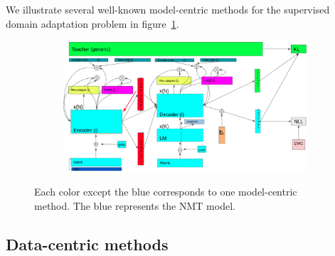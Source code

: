We illustrate several well-known model-centric methods for the supervised domain adaptation problem in figure~\ref{fig:model-centric-case1-case2}.
\begin{figure}[htbp]
\begin{subfigure}{1.0\textwidth}
  \centering
  \includegraphics[width=1.0\textwidth]{graphics/supervised_mdmt}
\end{subfigure}
\newline
\begin{subfigure}{1.0\textwidth}
  \centering
\end{subfigure}
\caption[Model-centric's brief overview]{Each color except the blue corresponds to one model-centric method. The blue represents the NMT model.}
\label{fig:model-centric-case1-case2}
\end{figure}

\subsection{Data-centric methods}
